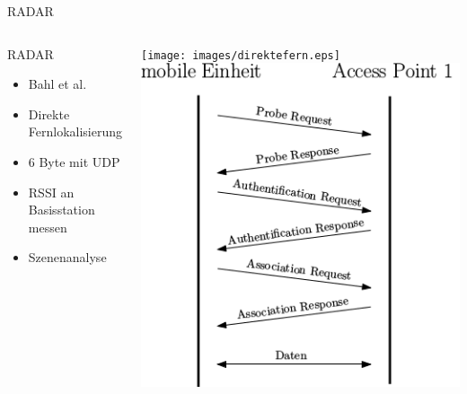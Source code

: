 \documentclass[18pt]{beamer}
\begin{document}
\begin{frame}{RADAR}
	\begin{columns}
			\begin{block}{RADAR}
				\begin{itemize}
					\item Bahl et al. \cite{bahl2000radar}
					\item Direkte Fernlokalisierung
					\item 6 Byte mit UDP
					\item RSSI an Basisstation messen
					\item Szenenanalyse
				\end{itemize}
			\end{block}
			\centering
			\texttt{[image: images/direktefern.eps]}
			\includegraphics[width=\textwidth]{images/reupper.png}
	\end{columns}
\end{frame}
\end{document}
